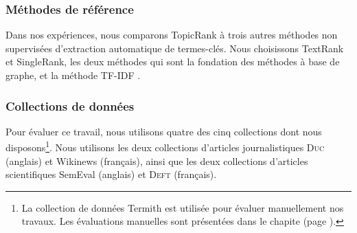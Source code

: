       \subsubsection{Méthodes de référence}
      \label{subsubsec:main-automatic_keyphrase_annotation-unsupervised_automatic_keyphrase_extraction-evaluation-baselines}
        Dans nos expériences, nous comparons TopicRank à trois autres
        méthodes non supervisées d'extraction automatique de termes-clés. Nous
        choisissons TextRank et SingleRank, les deux méthodes qui sont la
        fondation des méthodes à base de graphe, et la méthode TF-IDF .

      \subsubsection{Collections de données}
      \label{subsubsec:main-automatic_keyphrase_annotation-unsupervised_automatic_keyphrase_extraction-evaluation-evaluation_data}
        Pour évaluer ce travail, nous utilisons quatre des cinq collections dont
        nous disposons\footnote{La collection de données Termith est utilisée
        pour évaluer manuellement nos travaux. Les évaluations manuelles sont
        présentées dans le chapite  (page \TODO{}).}. Nous utilisons les
        deux collections d'articles journalistiques \textsc{Duc} (anglais) et
        Wikinews (français), ainsi que les deux collections d'articles
        scientifiques SemEval (anglais) et \textsc{Deft} (français).

